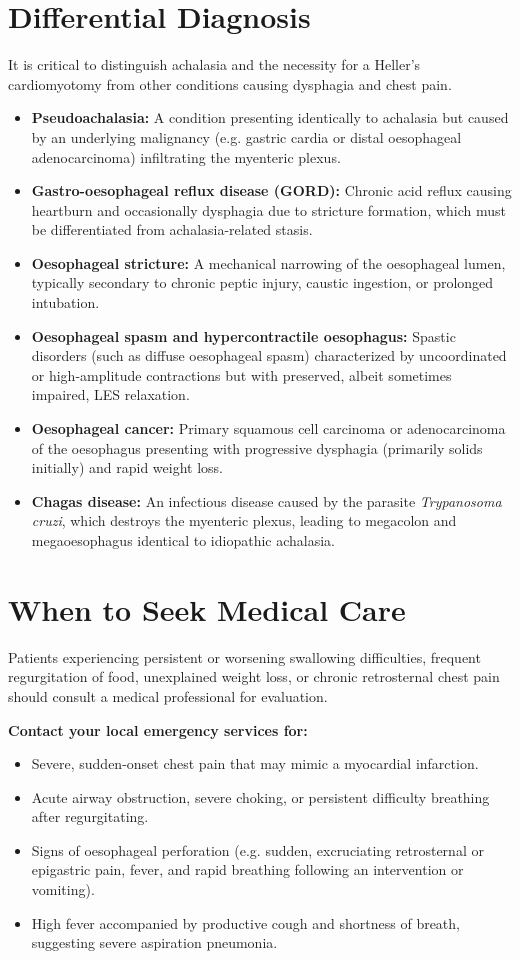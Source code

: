 \section*{Differential Diagnosis}
It is critical to distinguish achalasia and the necessity for a Heller's cardiomyotomy from other conditions causing dysphagia and chest pain.
\begin{itemize}
    \item \textbf{Pseudoachalasia:} A condition presenting identically to achalasia but caused by an underlying malignancy (e.g. gastric cardia or distal oesophageal adenocarcinoma) infiltrating the myenteric plexus.
    \item \textbf{Gastro-oesophageal reflux disease (GORD):} Chronic acid reflux causing heartburn and occasionally dysphagia due to stricture formation, which must be differentiated from achalasia-related stasis.
    \item \textbf{Oesophageal stricture:} A mechanical narrowing of the oesophageal lumen, typically secondary to chronic peptic injury, caustic ingestion, or prolonged intubation.
    \item \textbf{Oesophageal spasm and hypercontractile oesophagus:} Spastic disorders (such as diffuse oesophageal spasm) characterized by uncoordinated or high-amplitude contractions but with preserved, albeit sometimes impaired, LES relaxation.
    \item \textbf{Oesophageal cancer:} Primary squamous cell carcinoma or adenocarcinoma of the oesophagus presenting with progressive dysphagia (primarily solids initially) and rapid weight loss.
    \item \textbf{Chagas disease:} An infectious disease caused by the parasite \textit{Trypanosoma cruzi}, which destroys the myenteric plexus, leading to megacolon and megaoesophagus identical to idiopathic achalasia.
\end{itemize}

\section*{When to Seek Medical Care}
Patients experiencing persistent or worsening swallowing difficulties, frequent regurgitation of food, unexplained weight loss, or chronic retrosternal chest pain should consult a medical professional for evaluation.

\textbf{Contact your local emergency services for:}
\begin{itemize}
    \item Severe, sudden-onset chest pain that may mimic a myocardial infarction.
    \item Acute airway obstruction, severe choking, or persistent difficulty breathing after regurgitating.
    \item Signs of oesophageal perforation (e.g. sudden, excruciating retrosternal or epigastric pain, fever, and rapid breathing following an intervention or vomiting).
    \item High fever accompanied by productive cough and shortness of breath, suggesting severe aspiration pneumonia.
\end{itemize}

